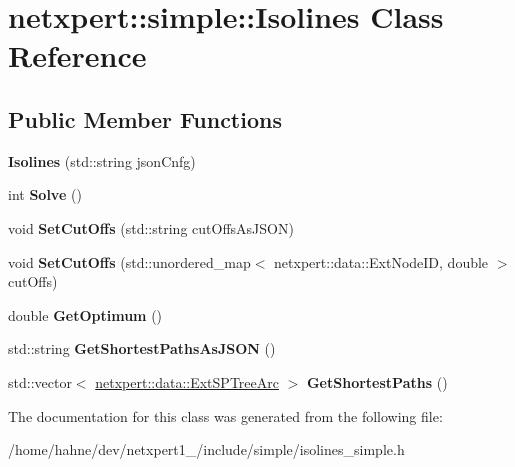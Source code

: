 \hypertarget{classnetxpert_1_1simple_1_1Isolines}{}\section{netxpert\+:\+:simple\+:\+:Isolines Class Reference}
\label{classnetxpert_1_1simple_1_1Isolines}
\subsection*{Public Member Functions}
\begin{DoxyCompactItemize}
\item 
{\bfseries Isolines} (std\+::string json\+Cnfg)\hypertarget{classnetxpert_1_1simple_1_1Isolines_a8727aeaafb1264b64073f7b5f4f0f6f0}{}\label{classnetxpert_1_1simple_1_1Isolines_a8727aeaafb1264b64073f7b5f4f0f6f0}

\item 
int {\bfseries Solve} ()\hypertarget{classnetxpert_1_1simple_1_1Isolines_a1b80fb16c7b49cc434b1436b8703576d}{}\label{classnetxpert_1_1simple_1_1Isolines_a1b80fb16c7b49cc434b1436b8703576d}

\item 
void {\bfseries Set\+Cut\+Offs} (std\+::string cut\+Offs\+As\+J\+S\+ON)\hypertarget{classnetxpert_1_1simple_1_1Isolines_a0546706debe1d7c87c61ba292b0a1e29}{}\label{classnetxpert_1_1simple_1_1Isolines_a0546706debe1d7c87c61ba292b0a1e29}

\item 
void {\bfseries Set\+Cut\+Offs} (std\+::unordered\+\_\+map$<$ netxpert\+::data\+::\+Ext\+Node\+ID, double $>$ cut\+Offs)\hypertarget{classnetxpert_1_1simple_1_1Isolines_ac7281b0cf2db016a9ca3496c21bcb9d2}{}\label{classnetxpert_1_1simple_1_1Isolines_ac7281b0cf2db016a9ca3496c21bcb9d2}

\item 
double {\bfseries Get\+Optimum} ()\hypertarget{classnetxpert_1_1simple_1_1Isolines_a6b4eca4f9029c5b34ae5d10abb406f9c}{}\label{classnetxpert_1_1simple_1_1Isolines_a6b4eca4f9029c5b34ae5d10abb406f9c}

\item 
std\+::string {\bfseries Get\+Shortest\+Paths\+As\+J\+S\+ON} ()\hypertarget{classnetxpert_1_1simple_1_1Isolines_ab3d1a1300dbfa15e896a0adb0b149145}{}\label{classnetxpert_1_1simple_1_1Isolines_ab3d1a1300dbfa15e896a0adb0b149145}

\item 
std\+::vector$<$ \hyperlink{structnetxpert_1_1data_1_1ExtSPTreeArc}{netxpert\+::data\+::\+Ext\+S\+P\+Tree\+Arc} $>$ {\bfseries Get\+Shortest\+Paths} ()\hypertarget{classnetxpert_1_1simple_1_1Isolines_ad69ef5676ba0ab6bd6aba752371c7a0e}{}\label{classnetxpert_1_1simple_1_1Isolines_ad69ef5676ba0ab6bd6aba752371c7a0e}

\end{DoxyCompactItemize}


The documentation for this class was generated from the following file\+:\begin{DoxyCompactItemize}
\item 
/home/hahne/dev/netxpert1\+\_/include/simple/isolines\+\_\+simple.\+h\end{DoxyCompactItemize}
